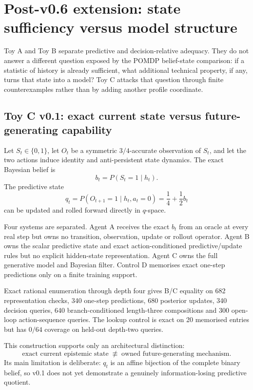 \documentclass[10pt]{article}
\begin{document}
\section{Post-v0.6 extension: state sufficiency versus model structure}
\label{sec:toyc}

Toy A and Toy B separate predictive and decision-relative adequacy. They do not answer a different question exposed by the POMDP belief-state comparison: if a statistic of history is already sufficient, what additional technical property, if any, turns that state into a model? Toy C attacks that question through finite counterexamples rather than by adding another profile coordinate.

\subsection{Toy C v0.1: exact current state versus future-generating capability}

Let $S_t\in\{0,1\}$, let $O_t$ be a symmetric $3/4$-accurate observation of $S_t$, and let the two actions induce identity and anti-persistent state dynamics. The exact Bayesian belief is
\[
b_t=P(S_t=1\mid h_t).
\]
The predictive state
\[
q_t=P(O_{t+1}=1\mid h_t,a_t=0)
=\frac14+\frac12 b_t
\]
can be updated and rolled forward directly in $q$-space.

Four systems are separated. Agent A receives the exact $b_t$ from an oracle at every real step but owns no transition, observation, update or rollout operator. Agent B owns the scalar predictive state and exact action-conditioned predictive/update rules but no explicit hidden-state representation. Agent C owns the full generative model and Bayesian filter. Control D memorises exact one-step predictions only on a finite training support.

Exact rational enumeration through depth four gives B/C equality on 682 representation checks, 340 one-step predictions, 680 posterior updates, 340 decision queries, 640 branch-conditioned length-three compositions and 300 open-loop action-sequence queries. The lookup control is exact on 20 memorised entries but has $0/64$ coverage on held-out depth-two queries.

This construction supports only an architectural distinction:
\[
\text{exact current epistemic state}
\;\not\equiv\;
\text{owned future-generating mechanism}.
\]
Its main limitation is deliberate: $q_t$ is an affine bijection of the complete binary belief, so v0.1 does not yet demonstrate a genuinely information-losing predictive quotient.
\end{document}
